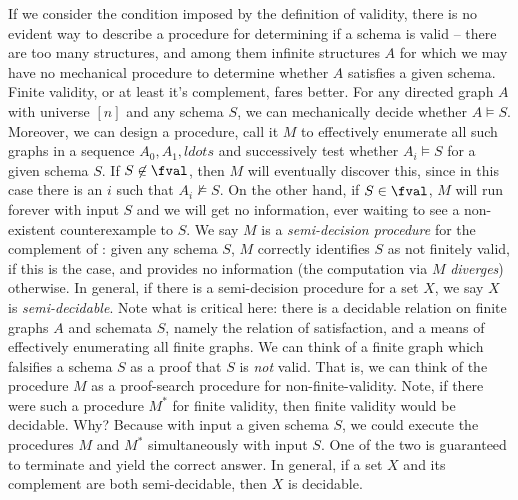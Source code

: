 If we consider the condition imposed by the definition of validity, there is no evident way to describe a procedure for determining if a schema is valid -- there are too many structures, and among them infinite structures $A$ for which we may have no mechanical procedure to determine whether $A$ satisfies a given schema. Finite validity, or at least it's complement, fares better. For any directed graph $A$ with universe $[n]$ and any schema $S$, we can mechanically decide whether $A\models S$. Moreover, we can design a procedure, call it $M$ to effectively enumerate all such graphs in a sequence $A_0, A_1, ldots$ and successively test whether $A_i\models S$ for a given schema $S$. If $S\not\in\fval$, then $M$ will eventually discover this, since in this case there is an $i$ such that $A_i\not\models S$. On the other hand, if $S\in\fval$, $M$ will run forever with input $S$ and we will get no information, ever waiting to see a non-existent counterexample to $S$. We say $M$ is a \emph{semi-decision procedure} for the complement of \fval:  given any schema $S$, $M$ correctly identifies $S$ as not finitely valid, if this is the case, and provides no information (the computation via $M$ \emph{diverges}) otherwise. In general, if there is a semi-decision procedure for a set $X$, we say $X$ is \emph{semi-decidable}. Note what is critical here: there is a decidable relation on finite graphs $A$ and schemata $S$, namely the relation of satisfaction, and a means of effectively enumerating all finite graphs. We can think of a finite graph which falsifies a schema $S$ as a proof that $S$ is \emph{not} valid. That is, we can think of the procedure $M$ as a proof-search procedure for non-finite-validity. Note, if there were such a procedure $M^*$ for finite validity, then finite validity would be decidable. Why? Because with input a given schema $S$, we could execute the procedures $M$ and $M^*$ simultaneously with input $S$. One of the two is guaranteed to terminate and yield the correct answer. In general, if a set $X$ and its complement are both semi-decidable, then $X$ is decidable. 

